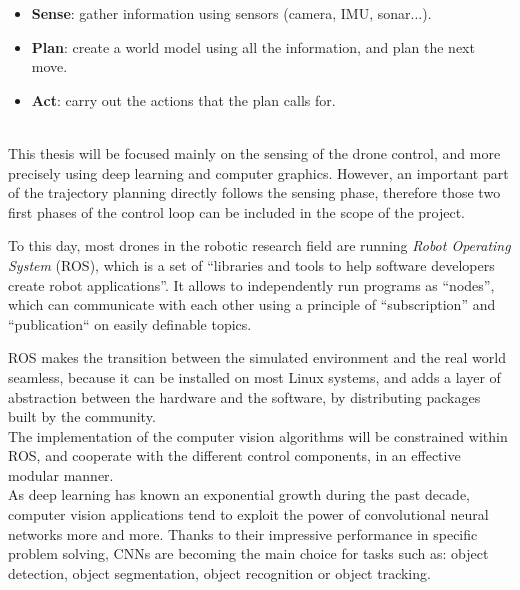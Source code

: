 \begin{itemize}
	\item{\textbf{Sense}}: gather information using sensors (camera, IMU, sonar...).
	\item{\textbf{Plan}}: create a world model using all the information, and plan
		the next move.
	\item{\textbf{Act}}: carry out the actions that the plan calls for.
\end{itemize}

~\\
This thesis will be focused mainly on the sensing of the drone control, and
more precisely using deep learning and computer graphics. However, an important
part of the trajectory planning directly follows the sensing phase, therefore
those two first phases of the control loop can be included in the scope of the
project.

To this day, most drones in the robotic research field are running \emph{Robot
Operating System} (ROS),  which is a set of ``libraries and
tools to help software developers create robot applications''. It allows to
independently run programs as ``nodes'', which can communicate with each other
using a principle of ``subscription'' and ``publication`` on easily definable
topics.


ROS makes the transition between the simulated environment and the real world
seamless, because it can be installed on most Linux systems, and adds a layer
of abstraction between the hardware and the software, by distributing packages
built by the community.\\

The implementation of the computer vision algorithms will be constrained within
ROS, and cooperate with the different control components, in an effective
modular manner.\\

As deep learning has known an exponential growth during the past decade,
computer vision applications tend to exploit the power of convolutional neural
networks more and more. Thanks to their impressive performance in specific
problem solving, CNNs are becoming the main choice for tasks such as: object
detection, object segmentation, object recognition or object tracking.

